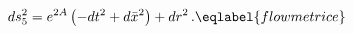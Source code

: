 \begin{equation}
ds_5^2=e^{2 A} \left(-dt^2 +d\bar{x}^2\right)+dr^2\,.
\eqlabel{flowmetrice}
\end{equation}

